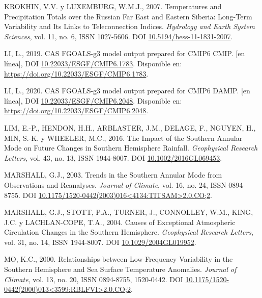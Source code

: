 \documentclass[12pt,oneside,a4paper]{reedthesis}
\newlength{\cslhangindent}
\newenvironment{CSLReferences}[2] %
 {%
  \setlength{\parindent}{0pt}
  \ifodd #1 \everypar{\setlength{\hangindent}{\cslhangindent}}\ignorespaces\fi
  \ifnum #2 > 0
  \setlength{\parskip}{#2\baselineskip}
  \fi
 }%
 {}
\begin{document}
\begin{CSLReferences}{1}{0}
\leavevmode{}%
KROKHIN, V.V. y LUXEMBURG, W.M.J., 2007. Temperatures and Precipitation Totals over the {Russian Far East} and {Eastern Siberia}: Long-Term Variability and Its Links to Teleconnection Indices. \emph{Hydrology and Earth System Sciences}, vol. 11, no. 6, ISSN 1027-5606. DOI \href{https://doi.org/10.5194/hess-11-1831-2007}{10.5194/hess-11-1831-2007}.

\leavevmode{}%
LI, L., 2019. CAS FGOALS-g3 model output prepared for CMIP6 CMIP. {[}en línea{]}, DOI \href{https://doi.org/10.22033/ESGF/CMIP6.1783}{10.22033/ESGF/CMIP6.1783}. Disponible en: \url{https://doi.org/10.22033/ESGF/CMIP6.1783}.

\leavevmode{}%
LI, L., 2020. CAS FGOALS-g3 model output prepared for CMIP6 DAMIP. {[}en línea{]}, DOI \href{https://doi.org/10.22033/ESGF/CMIP6.2048}{10.22033/ESGF/CMIP6.2048}. Disponible en: \url{https://doi.org/10.22033/ESGF/CMIP6.2048}.

\leavevmode{}%
LIM, E.-P., HENDON, H.H., ARBLASTER, J.M., DELAGE, F., NGUYEN, H., MIN, S.-K. y WHEELER, M.C., 2016. The Impact of the {Southern Annular Mode} on Future Changes in {Southern Hemisphere} Rainfall. \emph{Geophysical Research Letters}, vol. 43, no. 13, ISSN 1944-8007. DOI \href{https://doi.org/10.1002/2016GL069453}{10.1002/2016GL069453}.

\leavevmode{}%
MARSHALL, G.J., 2003. Trends in the {Southern Annular Mode} from {Observations} and {Reanalyses}. \emph{Journal of Climate}, vol. 16, no. 24, ISSN 0894-8755. DOI \href{https://doi.org/10.1175/1520-0442(2003)016\%3C4134:TITSAM\%3E2.0.CO;2}{10.1175/1520-0442(2003)016\textless4134:TITSAM\textgreater2.0.CO;2}.

\leavevmode{}%
MARSHALL, G.J., STOTT, P.A., TURNER, J., CONNOLLEY, W.M., KING, J.C. y LACHLAN-COPE, T.A., 2004. Causes of Exceptional Atmospheric Circulation Changes in the {Southern Hemisphere}. \emph{Geophysical Research Letters}, vol. 31, no. 14, ISSN 1944-8007. DOI \href{https://doi.org/10.1029/2004GL019952}{10.1029/2004GL019952}.

\leavevmode{}%
MO, K.C., 2000. Relationships between {Low-Frequency Variability} in the {Southern Hemisphere} and {Sea Surface Temperature Anomalies}. \emph{Journal of Climate}, vol. 13, no. 20, ISSN 0894-8755, 1520-0442. DOI \href{https://doi.org/10.1175/1520-0442(2000)013\%3C3599:RBLFVI\%3E2.0.CO;2}{10.1175/1520-0442(2000)013\textless3599:RBLFVI\textgreater2.0.CO;2}.


\end{CSLReferences}
\end{document}
